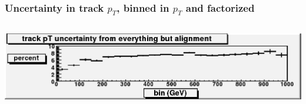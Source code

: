 \documentclass[compress]{beamer}
\begin{document}
\begin{frame}
\frametitle{Uncertainty in track $p_T$, binned in $p_T$ and factorized}
\begin{columns}
\includegraphics[width=\linewidth]{track_uncertainty_from_all_but_alignment.png}



\end{columns}
\end{frame}
\end{document}
